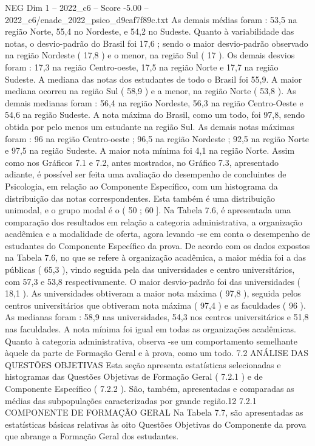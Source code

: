 \begin{textsample}{NEG Dim 1 – 2022\_c6 – Score -5.00 – 2022\_c6/enade\_2022\_psico\_d9caf7f89c.txt}
As demais médias foram : 53,5 na região Norte, 55,4 no Nordeste, e 54,2 no Sudeste.
Quanto à variabilidade das notas, o desvio-padrão do Brasil foi 17,6 ; sendo o maior desvio-padrão observado na região Nordeste ( 17,8 ) e o menor, na região Sul ( 17 ).
Os demais desvios foram : 17,3 na região Centro-oeste, 17,5 na região Norte e 17,7 na região Sudeste.
A mediana das notas dos estudantes de todo o Brasil foi 55,9.
A maior mediana ocorreu na região Sul ( 58,9 ) e a menor, na região Norte ( 53,8 ).
As demais medianas foram : 56,4 na região Nordeste, 56,3 na região Centro-Oeste e 54,6 na região Sudeste.
A nota máxima do Brasil, como um todo, foi 97,8, sendo obtida por pelo menos um estudante na região Sul.
As demais notas máximas foram : 96 na região Centro-oeste ; 96,5 na região Nordeste ; 92,5 na região Norte e 97,5 na região Sudeste.
A maior nota mínima foi 4,1 na região Norte.
Assim como nos Gráficos 7.1 e 7.2, antes mostrados, no Gráfico 7.3, apresentado adiante, é possível ser feita uma avaliação do desempenho de concluintes de Psicologia, em relação ao Componente Específico, com um histograma da distribuição das notas correspondentes.
Esta também é uma distribuição unimodal, e o grupo modal é o ( 50 ; 60 ].
Na Tabela 7.6, é apresentada uma comparação dos resultados em relação a categoria administrativa, a organização acadêmica e a modalidade de oferta, agora levando -se em conta o desempenho de estudantes do Componente Específico da prova.
De acordo com os dados expostos na Tabela 7.6, no que se refere à organização acadêmica, a maior média foi a das públicas ( 65,3 ), vindo seguida pela das universidades e centro universitários, com 57,3 e 53,8 respectivamente.
O maior desvio-padrão foi das universidades ( 18,1 ).
As universidades obtiveram a maior nota máxima ( 97,8 ), seguida pelos centros universitários que obtiveram nota máxima ( 97,4 ) e as faculdades ( 96 ).
As medianas foram : 58,9 nas universidades, 54,3 nos centros universitários e 51,8 nas faculdades.
A nota mínima foi igual em todas as organizações acadêmicas.
Quanto à categoria administrativa, observa -se um comportamento semelhante àquele da parte de Formação Geral e à prova, como um todo. 7.2 ANÁLISE DAS QUESTÕES OBJETIVAS Esta seção apresenta estatísticas selecionadas e histogramas das Questões Objetivas de Formação Geral ( 7.2.1 ) e de Componente Específico ( 7.2.2 ).
São, também, apresentadas e comparadas as médias das subpopulações caracterizadas por grande região.12 7.2.1 COMPONENTE DE FORMAÇÃO GERAL Na Tabela 7.7, são apresentadas as estatísticas básicas relativas às oito Questões Objetivas do Componente da prova que abrange a Formação Geral dos estudantes.

\end{textsample}
